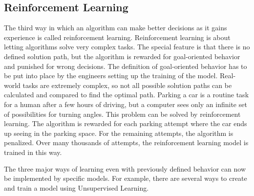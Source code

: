 		\subsection{Reinforcement Learning}
		The third way in which an algorithm can make better decisions as it gains experience is called reinforcement learning. Reinforcement learning is about letting algorithms solve very complex tasks. The special feature is that there is no defined solution path, but the algorithm is rewarded for goal-oriented behavior and punished for wrong decisions. The definition of goal-oriented behavior has to be put into place by the engineers setting up the training of the model. Real-world tasks are extremely complex, so not all possible solution paths can be calculated and compared to find the optimal path. Parking a car is a routine task for a human after a few hours of driving, but a computer sees only an infinite set of possibilities for turning angles. This problem can be solved by reinforcement learning. The algorithm is rewarded for each parking attempt where the car ends up seeing in the parking space. For the remaining attempts, the algorithm is penalized. Over many thousands of attempts, the reinforcement learning model is trained in this way.
		
		The three major ways of learning even with previously defined behavior can now be implemented by specific models. For example, there are several ways to create and train a model using Unsupervised Learning.
		